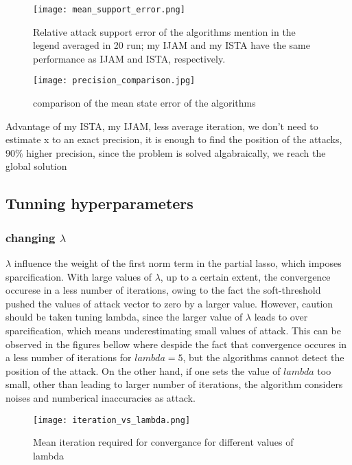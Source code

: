 \begin{figure}[H] %
    \centering
    \texttt{[image: mean\_support\_error.png]} %
    \caption{Relative attack support error of the algorithms mention in the legend averaged in 20 run; my IJAM and my ISTA have the same performance as IJAM and ISTA, respectively.}
    \label{fig:example}
\end{figure}

\begin{figure}[H] %
    \centering
    \texttt{[image: precision\_comparison.jpg]} %
    \caption{comparison of the mean state error of the algorithms}
    \label{fig:example}
\end{figure}

Advantage of my ISTA, my IJAM, less average iteration, we don't need to estimate x to an exact precision, it is enough to find the position of the attacks, $90\%$ higher precision, since the problem is solved algabraically, we reach the global solution

\subsection{Tunning hyperparameters}
\subsubsection{changing $\lambda$}
$\lambda$ influence the weight of the first norm term in the partial lasso, which imposes sparcification. With large values of  $\lambda$, up to a certain extent, the convergence occurese in a less number of iterations, owing to the fact the soft-threshold pushed the values of attack vector to zero by a larger value. However, caution should be taken tuning lambda, since the larger value of $\lambda$ leads to over sparcification, which means underestimating small values of attack. This can be observed in the figures bellow where despide the fact that convergence occures in a less number of iterations for $lambda = 5$, but the algorithms cannot detect the position of the attack. On the other hand, if one sets the value of $lambda$ too small, other than leading to larger number of iterations, the algorithm considers noises and numberical inaccuracies as attack. 

\begin{figure}[H] %
    \centering
    \texttt{[image: iteration\_vs\_lambda.png]} %
    \caption{Mean iteration required for convergance for different values of lambda}
    \label{fig:example}
\end{figure}

